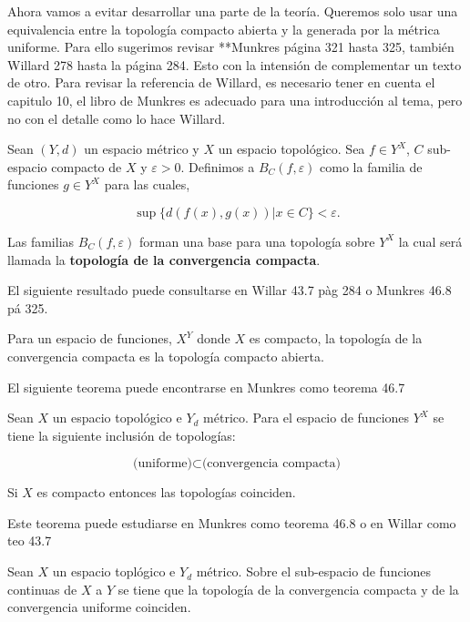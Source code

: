 Ahora vamos a evitar desarrollar una parte de la teoría. Queremos solo usar una equivalencia entre la topología compacto abierta y la generada por la métrica uniforme. Para ello sugerimos revisar **Munkres página 321 hasta 325, también Willard 278 hasta la página 284. Esto con la intensión de complementar un texto de otro. Para revisar la referencia de Willard, es necesario tener en cuenta el capitulo 10, el libro de Munkres es adecuado para una introducción al tema, pero no con el detalle como lo hace Willard.

\begin{df}
Sean $(Y,d)$ un espacio métrico y $X$ un espacio topológico. Sea $f \in Y^X$, $C$ sub-espacio compacto de $X$ y $\varepsilon > 0$. Definimos a $B_C(f, \varepsilon)$ como la familia de funciones $g \in Y ^X$ para las cuales,

$$\sup \{d(f(x),g(x))|x \in C \} < \varepsilon.$$

Las familias  $B_C(f,\varepsilon)$ forman una base para una topología sobre $Y^X$ la cual será llamada la \textbf{topología de la convergencia compacta}.  
\end{df}
El siguiente resultado puede consultarse en Willar 43.7 pàg 284 o Munkres 46.8 pá 325.

\begin{te}
Para un espacio de funciones, $X^Y$ donde $X$ es compacto, la topología de la convergencia compacta es la topología compacto abierta. 
\end{te}


El siguiente teorema puede encontrarse en Munkres como teorema 46.7

\begin{te}
Sean $X$ un espacio topológico e $Y_d $ métrico. Para el espacio de funciones $Y^X$ se tiene la siguiente inclusión de topologías:

$$\text{(uniforme)} \subset \text{(convergencia compacta)}$$ 

Si $X$ es compacto entonces las topologías coinciden. 
\end{te}

Este teorema puede estudiarse en Munkres como teorema 46.8 o en Willar como teo 43.7

\begin{te}
Sean $X$ un espacio toplógico e $Y_d $ métrico. Sobre el sub-espacio de funciones continuas de $X$ a $Y$ se tiene que la topología de la convergencia compacta y de la convergencia uniforme coinciden. 
\end{te}

